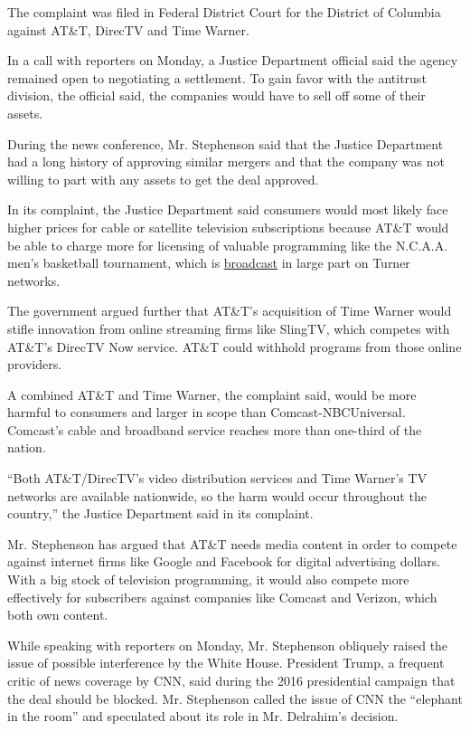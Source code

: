 The complaint was filed in Federal District Court for the District of
Columbia against AT\&T, DirecTV and Time Warner.

In a call with reporters on Monday, a Justice Department official said
the agency remained open to negotiating a settlement. To gain favor with
the antitrust division, the official said, the companies would have to
sell off some of their assets.

During the news conference, Mr. Stephenson said that the Justice
Department had a long history of approving similar mergers and that the
company was not willing to part with any assets to get the deal
approved.

In its complaint, the Justice Department said consumers would most
likely face higher prices for cable or satellite television
subscriptions because AT\&T would be able to charge more for licensing
of valuable programming like the N.C.A.A. men's basketball tournament,
which is
\href{http://www.ncaa.com/news/basketball-men/article/march-madness-2017-tv-schedule-how-watch-and-live-stream}{broadcast}
in large part on Turner networks.

The government argued further that AT\&T's acquisition of Time Warner
would stifle innovation from online streaming firms like SlingTV, which
competes with AT\&T's DirecTV Now service. AT\&T could withhold programs
from those online providers.

A combined AT\&T and Time Warner, the complaint said, would be more
harmful to consumers and larger in scope than Comcast-NBCUniversal.
Comcast's cable and broadband service reaches more than one-third of the
nation.

``Both AT\&T/DirecTV's video distribution services and Time Warner's TV
networks are available nationwide, so the harm would occur throughout
the country,'' the Justice Department said in its complaint.

Mr. Stephenson has argued that AT\&T needs media content in order to
compete against internet firms like Google and Facebook for digital
advertising dollars. With a big stock of television programming, it
would also compete more effectively for subscribers against companies
like Comcast and Verizon, which both own content.

While speaking with reporters on Monday, Mr. Stephenson obliquely raised
the issue of possible interference by the White House. President Trump,
a frequent critic of news coverage by CNN, said during the 2016
presidential campaign that the deal should be blocked. Mr. Stephenson
called the issue of CNN the ``elephant in the room'' and speculated
about its role in Mr. Delrahim's decision.

